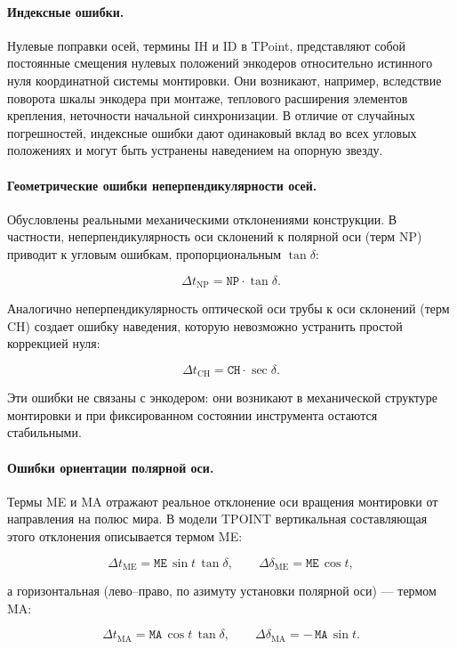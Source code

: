 \paragraph{Индексные ошибки.} Нулевые поправки осей, термины IH и ID в TPoint, представляют собой постоянные смещения нулевых положений энкодеров относительно истинного нуля координатной системы монтировки. Они возникают, например, вследствие поворота шкалы энкодера при монтаже, теплового расширения элементов крепления, неточности начальной синхронизации. В отличие от случайных погрешностей, индексные ошибки дают одинаковый вклад во всех угловых положениях и могут быть устранены наведением на опорную звезду.

\paragraph{Геометрические ошибки неперпендикулярности осей.} Обусловлены реальными механическими отклонениями конструкции. В частности, неперпендикулярность оси склонений к полярной оси (терм NP) приводит к угловым ошибкам, пропорциональным $\tan\delta$:

$$
\Delta t_{\text{NP}} = \mathtt{NP} \cdot \tan\delta.
$$

Аналогично неперпендикулярность оптической оси трубы к оси склонений (терм CH) создает ошибку наведения, которую невозможно устранить простой коррекцией нуля:

$$
\Delta t_{\text{CH}} = \mathtt{CH} \cdot \sec\delta.
$$

Эти ошибки не связаны с энкодером: они возникают в механической структуре монтировки и при фиксированном состоянии инструмента остаются стабильными.
    
\paragraph{Ошибки ориентации полярной оси.} Термы ME и MA отражают реальное отклонение оси вращения монтировки от направления на полюс мира. В модели TPOINT вертикальная составляющая этого отклонения описывается термом ME:

$$
\Delta t_{\text{ME}} = \mathtt{ME}\,\sin t \,\tan\delta,
\qquad
\Delta \delta_{\text{ME}} = \mathtt{ME}\,\cos t ,
$$

а горизонтальная (лево--право, по азимуту установки полярной оси) --- термом MA:

$$
\Delta t_{\text{MA}} = \mathtt{MA}\,\cos t \,\tan\delta,
\qquad
\Delta \delta_{\text{MA}} = -\,\mathtt{MA}\,\sin t .
$$

